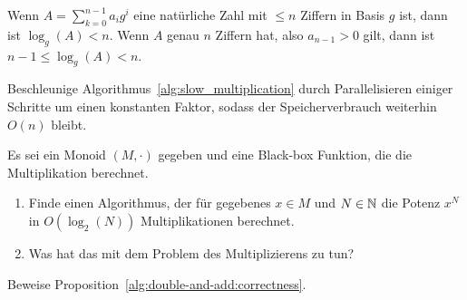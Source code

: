 
\begin{sheet}
    \begin{problem}
        Wenn $A = \sum_{k=0}^{n-1}a_i g^i$ eine natürliche Zahl mit $\leq n$ Ziffern in Basis $g$ ist, dann ist $\log_g(A)<n$. Wenn $A$ genau $n$ Ziffern hat, also $a_{n-1}>0$ gilt, dann ist $n-1\leq\log_g(A)<n$.
    \end{problem}

    \begin{problem}[title={Parallelisierung}]
        Beschleunige Algorithmus~\ref{alg:slow_multiplication} durch Parallelisieren einiger Schritte um einen konstanten Faktor, sodass der Speicherverbrauch weiterhin $O(n)$ bleibt.
    \end{problem}

    \begin{problem}[title={Square-and-multiply}]
        Es sei ein Monoid $(M,\cdot)$ gegeben und eine Black-box Funktion, die die Multiplikation berechnet.

        \begin{enumerate}
            \item Finde einen Algorithmus, der für gegebenes $x\in M$ und $N\in\mathbb{N}$ die Potenz $x^N$ in $O(\log_2(N))$ Multiplikationen berechnet.
            \item Was hat das mit dem Problem des Multiplizierens zu tun?
        \end{enumerate}
    \end{problem}

    \begin{problem}
        Beweise Proposition~\ref{alg:double-and-add:correctness}.
    \end{problem}

\end{sheet}
